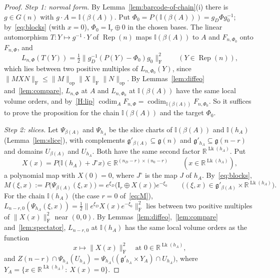 \documentclass[11pt,a4paper]{article}
\theoremstyle{definition}
\theoremstyle{remark}
\numberwithin{equation}{section}
\newcommand{\R}{\mathbb{R}}
\newcommand{\Rep}{\operatorname{Rep}}
\newcommand{\codim}{\operatorname{codim}}
\newcommand{\id}{\mathrm{I}}
\newcommand{\Fr}[1]{\lVert #1\rVert_{\mathrm F}}
\newcommand{\norm}[1]{\lVert #1\rVert}
\newcommand{\I}{\mathbb I}
\newcommand{\g}{\mathfrak g}
\newcommand{\Lk}{\operatorname{Lk}}
\begin{document}
\begin{proof}
\emph{Step 1: normal form.} By Lemma~\ref{lem:barcode-of-chain}(i) there is $g\in G(n)$ with $g\cdot A=\I(\beta(A))$. Put $\Phi_0=P(\I(\beta(A)))=g_D\Phi g_0^{-1}$; by~\eqref{eq:blocks} (with $x=0$), $\Phi_0=\id_r\oplus0$ in the chosen bases. The linear automorphism $T:Y\mapsto g^{-1}\cdot Y$ of $\Rep(n)$ maps $\I(\beta(A))$ to $A$ and $F_{n,\Phi_0}$ onto $F_{n,\Phi}$, and
\[
L_{n,\Phi}(T(Y))=\tfrac12\Fr{g_D^{-1}(P(Y)-\Phi_0)g_0}^2\qquad(Y\in\Rep(n)),
\]
which lies between two positive multiples of $L_{n,\Phi_0}(Y)$, since $\Fr{MXN}\le\norm M_{\mathrm{op}}\Fr X\norm N_{\mathrm{op}}$. By Lemmas~\ref{lem:diffeo} and~\ref{lem:compare}, $L_{n,\Phi}$ at $A$ and $L_{n,\Phi_0}$ at $\I(\beta(A))$ have the same local volume orders, and by~\ref{H:lip} $\codim_AF_{n,\Phi}=\codim_{\I(\beta(A))}F_{n,\Phi_0}$. So it suffices to prove the proposition for the chain $\I(\beta(A))$ and the target $\Phi_0$.

\emph{Step 2: slices.} Let $\Psi_{\beta(A)}$ and $\Psi_{h_A}$ be the slice charts of $\I(\beta(A))$ and $\I(h_A)$ (Lemma~\ref{lem:slice}), with complements $\g'_{\beta(A)}\subseteq\g(n)$ and $\g'_{h_A}\subseteq\g(n-r)$ and domains $U_{\beta(A)}$ and $U_{h_A}$. Both have the same second factor $\R^{\Lk(h_A)}$. Put
\[
X(x)=P\bigl(\I(h_A)+J^\circ x\bigr)\in\R^{(n_D-r)\times(n_0-r)}\qquad(x\in\R^{\Lk(h_A)}),
\]
a polynomial map with $X(0)=0$, where $J^\circ$ is the map $J$ of $h_A$. By~\eqref{eq:blocks},
\begin{equation}\label{eq:M}
M(\xi,x):=P\bigl(\Psi_{\beta(A)}(\xi,x)\bigr)=e^{\xi_D}\bigl(\id_r\oplus X(x)\bigr)e^{-\xi_0}\qquad\bigl((\xi,x)\in\g'_{\beta(A)}\times\R^{\Lk(h_A)}\bigr).
\end{equation}
For the chain $\I(h_A)$ (the case $r=0$ of~\eqref{eq:M}), $L_{n-r,0}(\Psi_{h_A}(\xi,x))=\frac12\Fr{e^{\xi_D}X(x)e^{-\xi_0}}^2$ lies between two positive multiples of $\Fr{X(x)}^2$ near $(0,0)$. By Lemmas~\ref{lem:diffeo},~\ref{lem:compare} and~\ref{lem:spectator}, $L_{n-r,0}$ at $\I(h_A)$ has the same local volume orders as the function
\[
x\mapsto\Fr{X(x)}^2\quad\text{at }0\in\R^{\Lk(h_A)},
\]
and $Z(n-r)\cap\Psi_{h_A}(U_{h_A})=\Psi_{h_A}\bigl((\g'_{h_A}\times Y_A)\cap U_{h_A}\bigr)$, where $Y_A=\{x\in\R^{\Lk(h_A)}:\ X(x)=0\}$.


\end{proof}
\end{document}
